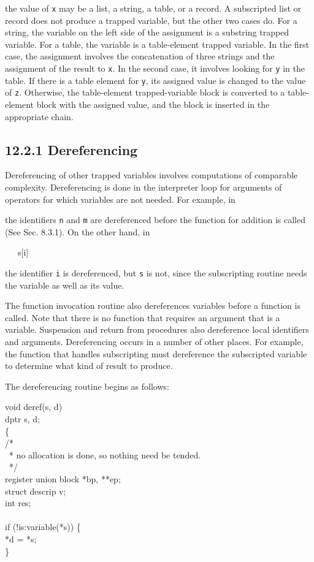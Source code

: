 
\noindent the value of \texttt{x} may be a list, a string, a table, or a
record. A subscripted list or record does not produce a trapped
variable, but the other two cases do. For a string, the variable on
the left side of the assignment is a substring trapped variable. For a
table, the variable is a table-element trapped variable. In the first
case, the assignment involves the concatenation of three strings and
the assignment of the result to \texttt{x}. In the second case, it involves
looking for \texttt{y} in the table. If there is a table element for \texttt{y}, its
assigned value is changed to the value of \texttt{z}.  Otherwise, the
table-element trapped-variable block is converted to a table-element
block with the assigned value, and the block is inserted in the
appropriate chain.

\subsection[12.2.1 Dereferencing]{12.2.1 Dereferencing}

Dereferencing of other trapped variables involves computations of
comparable complexity. Dereferencing is done in the interpreter loop
for arguments of operators for which variables are not needed. For
example, in


\noindent the identifiers \texttt{n} and \texttt{m} are dereferenced before the function
for addition is called (See Sec. 8.3.1). On the other hand, in

{\ttfamily\mdseries
\ \ \ s[i]}

\noindent the identifier \texttt{i} is dereferenced, but \texttt{s} is not, since the
subscripting routine needs the variable as well as its value.

The function invocation routine also dereferences variables before a
function is called. Note that there is no function that requires an
argument that is a variable. Suspension and return from procedures
also dereference local identifiers and arguments. Dereferencing occurs
in a number of other places. For example, the function that handles
subscripting must dereference the subscripted variable to determine
what kind of result to produce.

The dereferencing routine begins as follows:

\begin{iconcode}
void deref(s, d)\\
dptr s, d;\\
\>\{\\
\>/*\\
\>\ * no allocation is done, so nothing need be tended.\\
\>\ */\\
\>register union block *bp, **ep;\\
\>struct descrip v;\\
\>int res;\\
\\
\>if (!is:variable(*s)) \{\\
\>\>*d = *s;\\
\>\>\}
\end{iconcode}


